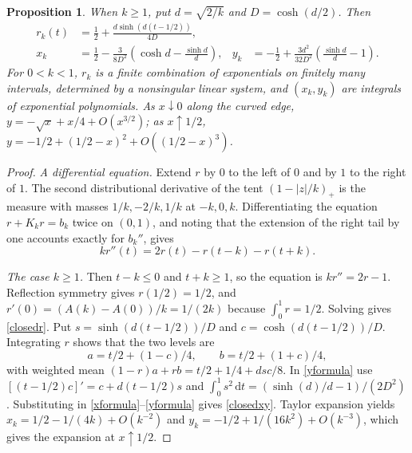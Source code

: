 \documentclass[11pt,a4paper]{article}
\newtheorem{proposition}[theorem]{Proposition}
\theoremstyle{remark}
\newcommand{\1}{\mathbf 1}
\newcommand{\dd}{\,\mathrm d}
\begin{document}
\begin{proposition}\label{finite}
When $k\ge1$, put $d=\sqrt{2/k}$ and $D=\cosh(d/2)$. Then
\begin{align}
 r_k(t)&=\tfrac12+\frac{d\sinh(d(t-1/2))}{4D},\label{closedr}\\
 x_k&=\tfrac12-\frac{3}{8D^2}\left(\cosh d-\frac{\sinh d}{d}\right),&
 y_k&=-\tfrac12+\frac{3d^2}{32D^2}\left(\frac{\sinh d}{d}-1\right).\label{closedxy}
\end{align}
For $0<k<1$, $r_k$ is a finite combination of exponentials on finitely many intervals, determined by a nonsingular linear system, and $(x_k,y_k)$ are integrals of exponential polynomials. As $x\downarrow0$ along the curved edge, $y=-\sqrt{x}+x/4+O(x^{3/2})$; as $x\uparrow1/2$, $y=-1/2+(1/2-x)^2+O((1/2-x)^3)$.
\end{proposition}
\begin{proof}
\emph{A differential equation.} Extend $r$ by $0$ to the left of $0$ and by $1$ to the right of $1$. The second distributional derivative of the tent $(1-|z|/k)_+$ is the measure with masses $1/k,-2/k,1/k$ at $-k,0,k$. Differentiating the equation $r+K_kr=b_k$ twice on $(0,1)$, and noting that the extension of the right tail by one accounts exactly for $b_k''$, gives
\[
 k r''(t)=2r(t)-r(t-k)-r(t+k).
\]

\emph{The case $k\ge1$.} Then $t-k\le0$ and $t+k\ge1$, so the equation is $kr''=2r-1$. Reflection symmetry gives $r(1/2)=1/2$, and $r'(0)=(A(k)-A(0))/k=1/(2k)$ because $\int_0^1r=1/2$. Solving gives \eqref{closedr}. Put $s=\sinh(d(t-1/2))/D$ and $c=\cosh(d(t-1/2))/D$. Integrating $r$ shows that the two levels are
\[
 a=t/2+(1-c)/4,\qquad b=t/2+(1+c)/4,
\]
with weighted mean $(1-r)a+rb=t/2+1/4+dsc/8$. In \eqref{yformula} use $[(t-1/2)c]'=c+d(t-1/2)s$ and $\int_0^1 s^2\dd t=(\sinh(d)/d-1)/(2D^2)$. Substituting in \eqref{xformula}--\eqref{yformula} gives \eqref{closedxy}. Taylor expansion yields $x_k=1/2-1/(4k)+O(k^{-2})$ and $y_k=-1/2+1/(16k^2)+O(k^{-3})$, which gives the expansion at $x\uparrow1/2$.


\end{proof}
\end{document}
